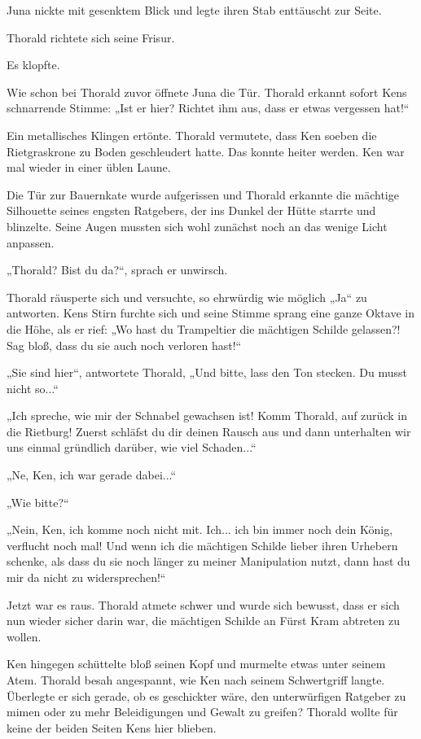 \documentclass[10pt, a4paper, oneside]{book}
\begin{document}
Juna nickte mit gesenktem Blick und legte ihren Stab enttäuscht zur Seite.

Thorald richtete sich seine Frisur.

Es klopfte.

Wie schon bei Thorald zuvor öffnete Juna die Tür. Thorald erkannt sofort Kens schnarrende Stimme: „Ist er hier? Richtet ihm aus, dass er etwas vergessen hat!“

Ein metallisches Klingen ertönte. Thorald vermutete, dass Ken soeben die Rietgraskrone zu Boden geschleudert hatte. Das konnte heiter werden. Ken war mal wieder in einer üblen Laune.

Die Tür zur Bauernkate wurde aufgerissen und Thorald erkannte die mächtige Silhouette seines engsten Ratgebers, der ins Dunkel der Hütte starrte und blinzelte. Seine Augen mussten sich wohl zunächst noch an das wenige Licht anpassen.

„Thorald? Bist du da?“, sprach er unwirsch.

Thorald räusperte sich und versuchte, so ehrwürdig wie möglich „Ja“ zu antworten. Kens Stirn furchte sich und seine Stimme sprang eine ganze Oktave in die Höhe, als er rief: „Wo hast du Trampeltier die mächtigen Schilde gelassen?! Sag bloß, dass du sie auch noch verloren hast!“

„Sie sind hier“, antwortete Thorald, „Und bitte, lass den Ton stecken. Du musst nicht so...“

„Ich spreche, wie mir der Schnabel gewachsen ist! Komm Thorald, auf zurück in die Rietburg! Zuerst schläfst du dir deinen Rausch aus und dann unterhalten wir uns einmal gründlich darüber, wie viel Schaden...“

„Ne, Ken, ich war gerade dabei...“

„Wie bitte?“

„Nein, Ken, ich komme noch nicht mit. Ich... ich bin immer noch dein König, verflucht noch mal! Und wenn ich die mächtigen Schilde lieber ihren Urhebern schenke, als dass du sie noch länger zu meiner Manipulation nutzt, dann hast du mir da nicht zu widersprechen!“

Jetzt war es raus. Thorald atmete schwer und wurde sich bewusst, dass er sich nun wieder sicher darin war, die mächtigen Schilde an Fürst Kram abtreten zu wollen.

Ken hingegen schüttelte bloß seinen Kopf und murmelte etwas unter seinem Atem. Thorald besah angespannt, wie Ken nach seinem Schwertgriff langte. Überlegte er sich gerade, ob es geschickter wäre, den unterwürfigen Ratgeber zu mimen oder zu mehr Beleidigungen und Gewalt zu greifen? Thorald wollte für keine der beiden Seiten Kens hier blieben.
\end{document}
